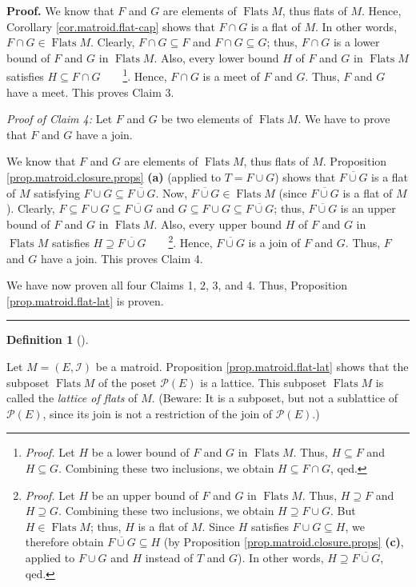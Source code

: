 \documentclass[numbers=enddot,12pt,final,onecolumn,notitlepage]{scrartcl}%
\theoremstyle{definition}
\newtheorem{defi}[theo]{Definition}
\newenvironment{definition}[1][]
{\begin{defi}[#1]\begin{leftbar}}
{\end{leftbar}\end{defi}}
\newenvironment{proof}[1][Proof]{\noindent\textbf{#1.} }{\ \rule{0.5em}{0.5em}}
\begin{document}
\begin{proof}
We know that $F$ and $G$ are elements of $\operatorname*{Flats}M$, thus flats
of $M$. Hence, Corollary \ref{cor.matroid.flat-cap} shows that $F\cap G$ is a
flat of $M$. In other words, $F\cap G\in\operatorname*{Flats}M$. Clearly,
$F\cap G\subseteq F$ and $F\cap G\subseteq G$; thus, $F\cap G$ is a lower
bound of $F$ and $G$ in $\operatorname*{Flats}M$. Also, every lower bound $H$
of $F$ and $G$ in $\operatorname*{Flats}M$ satisfies $H\subseteq F\cap
G$\ \ \ \ \footnote{\textit{Proof.} Let $H$ be a lower bound of $F$ and $G$ in
$\operatorname*{Flats}M$. Thus, $H\subseteq F$ and $H\subseteq G$. Combining
these two inclusions, we obtain $H\subseteq F\cap G$, qed.}. Hence, $F\cap G$
is a meet of $F$ and $G$. Thus, $F$ and $G$ have a meet. This proves Claim 3.

\textit{Proof of Claim 4:} Let $F$ and $G$ be two elements of
$\operatorname*{Flats}M$. We have to prove that $F$ and $G$ have a join.

We know that $F$ and $G$ are elements of $\operatorname*{Flats}M$, thus flats
of $M$. Proposition \ref{prop.matroid.closure.props} \textbf{(a)} (applied to
$T=F\cup G$) shows that $\overline{F\cup G}$ is a flat of $M$ satisfying
$F\cup G\subseteq\overline{F\cup G}$. Now, $\overline{F\cup G}\in
\operatorname*{Flats}M$ (since $\overline{F\cup G}$ is a flat of $M$).
Clearly, $F\subseteq F\cup G\subseteq\overline{F\cup G}$ and $G\subseteq F\cup
G\subseteq\overline{F\cup G}$; thus, $\overline{F\cup G}$ is an upper bound of
$F$ and $G$ in $\operatorname*{Flats}M$. Also, every upper bound $H$ of $F$
and $G$ in $\operatorname*{Flats}M$ satisfies $H\supseteq\overline{F\cup G}%
$\ \ \ \ \footnote{\textit{Proof.} Let $H$ be an upper bound of $F$ and $G$ in
$\operatorname*{Flats}M$. Thus, $H\supseteq F$ and $H\supseteq G$. Combining
these two inclusions, we obtain $H\supseteq F\cup G$. But $H\in
\operatorname*{Flats}M$; thus, $H$ is a flat of $M$. Since $H$ satisfies
$F\cup G\subseteq H$, we therefore obtain $\overline{F\cup G}\subseteq H$ (by
Proposition \ref{prop.matroid.closure.props} \textbf{(c)}, applied to $F\cup
G$ and $H$ instead of $T$ and $G$). In other words, $H\supseteq\overline{F\cup
G}$, qed.}. Hence, $\overline{F\cup G}$ is a join of $F$ and $G$. Thus, $F$
and $G$ have a join. This proves Claim 4.

We have now proven all four Claims 1, 2, 3, and 4. Thus, Proposition
\ref{prop.matroid.flat-lat} is proven.
\end{proof}

\begin{definition}
\label{def.matroid.flat-lat}Let $M=\left(  E,\mathcal{I}\right)  $ be a
matroid. Proposition \ref{prop.matroid.flat-lat} shows that the subposet
$\operatorname*{Flats}M$ of the poset $\mathcal{P}\left(  E\right)  $ is a
lattice. This subposet $\operatorname*{Flats}M$ is called the \textit{lattice
of flats} of $M$. (Beware: It is a subposet, but not a sublattice of
$\mathcal{P}\left(  E\right)  $, since its join is not a restriction of the
join of $\mathcal{P}\left(  E\right)  $.)
\end{definition}
\end{document}
